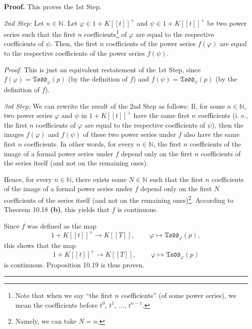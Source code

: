 \documentclass[numbers=enddot,12pt,final,onecolumn,notitlepage]{scrartcl}%
\newenvironment{proof}[1][Proof]{\noindent\textbf{#1.} }{\ \rule{0.5em}{0.5em}}
\begin{document}
\begin{proof}
This proves the 1st Step.

\textit{2nd Step:} Let $n\in\mathbb{N}$. Let $\varphi\in1+K\left[  \left[
t\right]  \right]  ^{+}$ and $\psi\in1+K\left[  \left[  t\right]  \right]
^{+}$ be two power series such that the first $n$ coefficients\footnote{Note
that when we say ``the first $n$ coefficients'' (of some power series), we
mean the coefficients before $t^{0}$, $t^{1}$, $...$, $t^{n-1}$.} of $\varphi$
are equal to the respective coefficients of $\psi$. Then, the first $n$
coefficients of the power series $f\left(  \varphi\right)  $ are equal to the
respective coefficients of the power series $f\left(  \psi\right)  $.

\textit{Proof.} This is just an equivalent restatement of the 1st Step, since
$f\left(  \varphi\right)  =\mathfrak{Todd}_{\varphi}\left(  p\right)  $ (by
the definition of $f$) and $f\left(  \psi\right)  =\mathfrak{Todd}_{\psi
}\left(  p\right)  $ (by the definition of $f$).

\textit{3rd Step:} We can rewrite the result of the 2nd Step as follows: If,
for some $n\in\mathbb{N}$, two power series $\varphi$ and $\psi$ in
$1+K\left[  \left[  t\right]  \right]  ^{+}$ have the same first $n$
coefficients (i. e., the first $n$ coefficients of $\varphi$ are equal to the
respective coefficients of $\psi$), then the images $f\left(  \varphi\right)
$ and $f\left(  \psi\right)  $ of these two power series under $f$ also have
the same first $n$ coefficients. In other words, for every $n\in\mathbb{N}$,
the first $n$ coefficients of the image of a formal power series under $f$
depend only on the first $n$ coefficients of the series itself (and not on the
remaining ones).

Hence, for every $n\in\mathbb{N}$, there exists some $N\in\mathbb{N}$ such
that the first $n$ coefficients of the image of a formal power series under
$f$ depend only on the first $N$ coefficients of the series itself (and not on
the remaining ones)\footnote{Namely, we can take $N=n$.}. According to Theorem
10.18 \textbf{(b)}, this yields that $f$ is continuous.

Since $f$ was defined as the map%
\[
1+K\left[  \left[  t\right]  \right]  ^{+}\rightarrow K\left[  \left[
T\right]  \right]  ,\ \ \ \ \ \ \ \ \ \ \varphi\mapsto\mathfrak{Todd}%
_{\varphi}\left(  p\right)  ,
\]
this shows that the map%
\[
1+K\left[  \left[  t\right]  \right]  ^{+}\rightarrow K\left[  \left[
T\right]  \right]  ,\ \ \ \ \ \ \ \ \ \ \varphi\mapsto\mathfrak{Todd}%
_{\varphi}\left(  p\right)
\]
is continuous. Proposition 10.19 is thus proven.
\end{proof}
\end{document}
